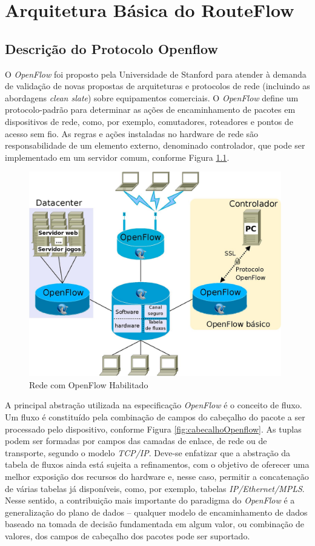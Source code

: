 \chapter{Arquitetura Básica do RouteFlow}

\section{Descrição do Protocolo Openflow}

O \textit{OpenFlow} foi proposto pela Universidade de Stanford para atender à demanda de validação
de novas propostas de arquiteturas e protocolos de rede (incluindo as abordagens \textit{clean slate})
sobre equipamentos comerciais. O \textit{OpenFlow} define um protocolo-padrão para determinar as
ações de encaminhamento de pacotes em dispositivos de rede, como, por exemplo,
comutadores, roteadores e pontos de acesso sem fio. As regras e ações instaladas no
hardware de rede são responsabilidade de um elemento externo, denominado controlador, que
pode ser implementado em um servidor comum, conforme Figura \ref{fig:openflow}. 

\begin{figure}[hb]
\centering
\includegraphics[width=110mm]{openflow.png}
\caption{Rede com OpenFlow Habilitado}
\label{fig:openflow}
\end{figure}

A principal abstração utilizada na especificação \textit{OpenFlow} é o conceito de fluxo. Um fluxo é
constituído pela combinação de campos do cabeçalho do pacote a ser processado pelo
dispositivo, conforme Figura \ref{fig:cabecalhoOpenflow}. As tuplas podem ser formadas por campos das camadas de
enlace, de rede ou de transporte, segundo o modelo \textit{TCP/IP}. Deve-se enfatizar que a
abstração da tabela de fluxos ainda está sujeita a refinamentos, com o objetivo de oferecer uma
melhor exposição dos recursos do hardware e, nesse caso, permitir a concatenação de várias
tabelas já disponíveis, como, por exemplo, tabelas \textit{IP/Ethernet/MPLS}. Nesse sentido, a
contribuição mais importante do paradigma do \textit{OpenFlow} é a generalização do plano de dados –
qualquer modelo de encaminhamento de dados baseado na tomada de decisão fundamentada
em algum valor, ou combinação de valores, dos campos de cabeçalho dos pacotes pode ser
suportado. 

